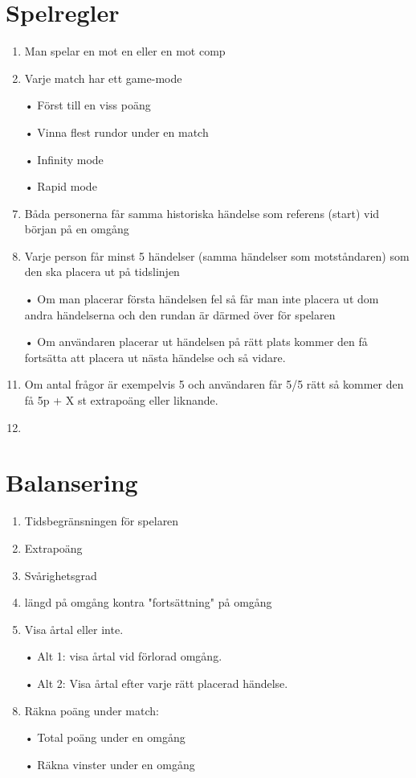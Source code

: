 \documentclass[a4paper,11pt]{article}
\begin{document}
\section{Spelregler}
\begin{enumerate}
\item Man spelar en mot en eller en mot comp
\item Varje match har ett game-mode
\item[•] Först till en viss poäng
\item[•] Vinna flest rundor under en match
\item[•] Infinity mode
\item[•] Rapid mode
\item Båda personerna får samma historiska händelse som referens (start) vid början på en omgång
\item Varje person får minst 5 händelser (samma händelser som motståndaren) som den ska placera ut på tidslinjen
\item[•] Om man placerar första händelsen fel så får man inte placera ut dom andra händelserna och den rundan är därmed över för spelaren
\item[•] Om användaren placerar ut händelsen på rätt plats kommer den få fortsätta att placera ut nästa händelse och så vidare.
\item Om antal frågor är exempelvis 5 och användaren får 5/5 rätt så kommer den få 5p + X st extrapoäng eller liknande.
\item   

\end{enumerate}

\section{Balansering}

\begin{enumerate}
\item Tidsbegränsningen för spelaren
\item Extrapoäng
\item Svårighetsgrad
\item längd på omgång kontra "fortsättning" på omgång
\item Visa årtal eller inte.
\item[•] Alt 1: visa årtal vid förlorad omgång.
\item[•] Alt 2: Visa årtal efter varje rätt placerad händelse.
\item Räkna poäng under match:
\item[•] Total poäng under en omgång
\item[•] Räkna vinster under en omgång
\end{enumerate}
\end{document}

